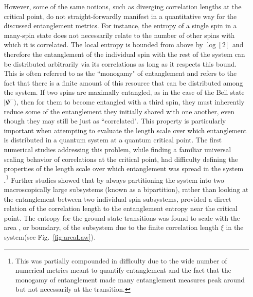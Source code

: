 However, some of the same notions, such as diverging correlation lengths at the critical point, do not straight-forwardly manifest in a quantitative way for the discussed entanglement metrics. For instance, the entropy of a single spin in a many-spin state does not necessarily relate to the number of other spins with which it is correlated. The local entropy is bounded from above by $\log[2]$ and therefore the entanglement of the individual spin with the rest of the system can be distributed arbitrarily via its correlations as long as it respects this bound. This is often referred to as the ``monogamy" of entanglement and refers to the fact that there is a finite amount of this resource that can be distributed among the system. If two spins are maximally entangled, as in the case of the Bell state $|\Psi^-\rangle$, then for them to become entangled with a third spin, they must inherently reduce some of the entanglement they initially shared with one another, even though they may still be just as ``correlated". This property is particularly important when attempting to evaluate the length scale over which entanglement is distributed in a quantum system at a quantum critical point. The first numerical studies addressing this problem, while finding a familiar universal scaling behavior of correlations at the critical point, had difficulty defining the properties of the length scale over which entanglement was spread in the system \cite{Osterloh2002,Osborne2002,Amico2008}.\footnote{This was partially compounded in difficulty due to the wide number of numerical metrics meant to quantify entanglement and the fact that the monogamy of entanglement made many entanglement measures peak around but not necessarily at the transition.} Further studies showed that by always partitioning the system into two macroscopically large subsystems (known as a bipartition), rather than looking at the entanglement between two individual spin subsystems, provided a direct relation of the correlation length to the entanglement entropy near the critical point\cite{Vidal2003}. The entropy for the ground-state transitions was found to scale with the area \cite{Eisert2010}, or boundary, of the subsystem due to the finite correlation length $\xi$ in the system(see Fig.~\ref{fig:areaLaw}).


